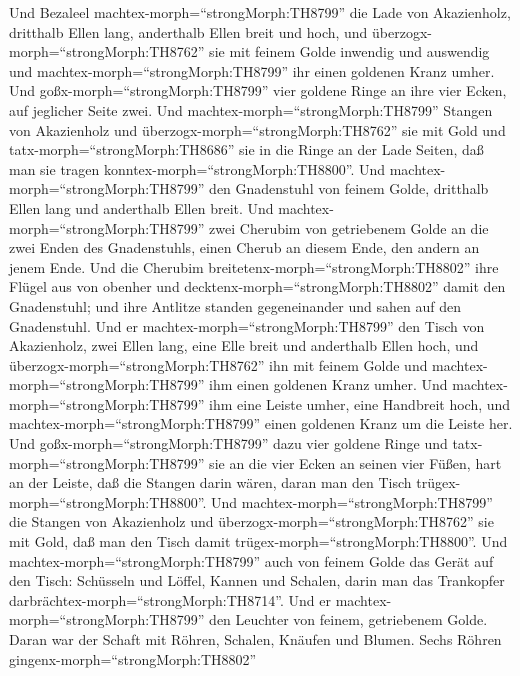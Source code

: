  Und Bezaleel machtex-morph=``strongMorph:TH8799'' die Lade
von Akazienholz, dritthalb Ellen lang, anderthalb Ellen breit und hoch,
 und überzogx-morph=``strongMorph:TH8762'' sie mit feinem
Golde inwendig und auswendig und machtex-morph=``strongMorph:TH8799''
ihr einen goldenen Kranz umher.  Und
goßx-morph=``strongMorph:TH8799'' vier goldene Ringe an ihre vier Ecken,
auf jeglicher Seite zwei.  Und
machtex-morph=``strongMorph:TH8799'' Stangen von Akazienholz und
überzogx-morph=``strongMorph:TH8762'' sie mit Gold  und
tatx-morph=``strongMorph:TH8686'' sie in die Ringe an der Lade Seiten,
daß man sie tragen konntex-morph=``strongMorph:TH8800''. 
Und machtex-morph=``strongMorph:TH8799'' den Gnadenstuhl von feinem
Golde, dritthalb Ellen lang und anderthalb Ellen breit.  Und
machtex-morph=``strongMorph:TH8799'' zwei Cherubim von getriebenem Golde
an die zwei Enden des Gnadenstuhls,  einen Cherub an diesem
Ende, den andern an jenem Ende.  Und die Cherubim
breitetenx-morph=``strongMorph:TH8802'' ihre Flügel aus von obenher und
decktenx-morph=``strongMorph:TH8802'' damit den Gnadenstuhl; und ihre
Antlitze standen gegeneinander und sahen auf den Gnadenstuhl.
 Und er machtex-morph=``strongMorph:TH8799'' den Tisch von
Akazienholz, zwei Ellen lang, eine Elle breit und anderthalb Ellen hoch,
 und überzogx-morph=``strongMorph:TH8762'' ihn mit feinem
Golde und machtex-morph=``strongMorph:TH8799'' ihm einen goldenen Kranz
umher.  Und machtex-morph=``strongMorph:TH8799'' ihm eine
Leiste umher, eine Handbreit hoch, und
machtex-morph=``strongMorph:TH8799'' einen goldenen Kranz um die Leiste
her.  Und goßx-morph=``strongMorph:TH8799'' dazu vier
goldene Ringe und tatx-morph=``strongMorph:TH8799'' sie an die vier
Ecken an seinen vier Füßen,  hart an der Leiste, daß die
Stangen darin wären, daran man den Tisch
trügex-morph=``strongMorph:TH8800''.  Und
machtex-morph=``strongMorph:TH8799'' die Stangen von Akazienholz und
überzogx-morph=``strongMorph:TH8762'' sie mit Gold, daß man den Tisch
damit trügex-morph=``strongMorph:TH8800''.  Und
machtex-morph=``strongMorph:TH8799'' auch von feinem Golde das Gerät auf
den Tisch: Schüsseln und Löffel, Kannen und Schalen, darin man das
Trankopfer darbrächtex-morph=``strongMorph:TH8714''.  Und
er machtex-morph=``strongMorph:TH8799'' den Leuchter von feinem,
getriebenem Golde. Daran war der Schaft mit Röhren, Schalen, Knäufen und
Blumen.  Sechs Röhren gingenx-morph=``strongMorph:TH8802''
